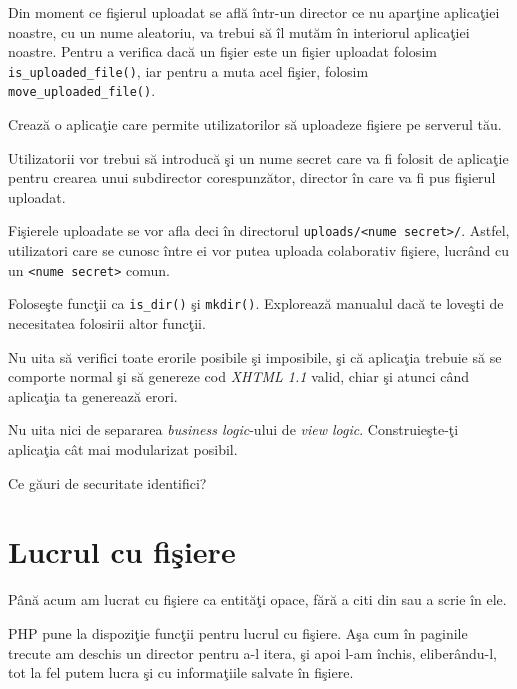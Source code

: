 Din moment ce fişierul uploadat se află într-un director ce nu aparţine
aplicaţiei noastre, cu un nume aleatoriu, va trebui să
îl mutăm în interiorul aplicaţiei noastre. Pentru
a verifica dacă un fişier este un fişier uploadat folosim
\texttt{is\_uploaded\_file()}, iar pentru a muta
acel fişier, folosim \texttt{move\_uploaded\_file()}.



\begin{Exercise}[title={Remote file storage},difficulty=2]
\ExePart

Crează o aplicaţie care permite utilizatorilor să
uploadeze fişiere pe serverul tău.

Utilizatorii vor trebui să introducă şi un nume secret
care va fi folosit de aplicaţie pentru crearea unui subdirector
corespunzător, director în care va fi pus fişierul uploadat.

Fişierele uploadate se vor afla deci în directorul
\texttt{uploads/<nume secret>/}. Astfel, utilizatori
care se cunosc între ei vor putea uploada colaborativ
fişiere, lucrând cu un \texttt{<nume secret>} comun.

Foloseşte funcţii ca \texttt{is\_dir()} şi
\texttt{mkdir()}. Explorează manualul dacă te
loveşti de necesitatea folosirii altor funcţii.

Nu uita să verifici toate erorile posibile şi
imposibile, şi că aplicaţia trebuie să
se comporte normal şi să genereze cod \textit{XHTML 1.1} valid, chiar şi atunci
când aplicaţia ta generează erori.

Nu uita nici de separarea \textit{business logic}-ului
de \textit{view logic}. Construieşte-ţi aplicaţia
cât mai modularizat posibil.

\ExePart
Ce găuri de securitate identifici?
\end{Exercise}

\section{Lucrul cu fişiere}
Până acum am lucrat cu fişiere ca entităţi opace, fără
a citi din sau a scrie în ele.

PHP pune la dispoziţie funcţii pentru lucrul
cu fişiere. Aşa cum în paginile trecute am deschis un
director pentru a-l itera, şi apoi l-am închis, eliberându-l,
tot la fel putem lucra şi cu informaţiile salvate în fişiere.


